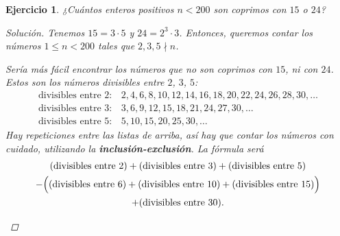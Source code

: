 \documentclass{article}
\theoremstyle{plain}
\newtheorem{ejercicio}{Ejercicio}
\newenvironment{solucion}{\begin{proof}[Solución]}{\end{proof}}
\begin{document}
\begin{ejercicio}
¿Cuántos enteros positivos $n < 200$ son coprimos con $15$ o $24$?

\ifdefined\solutions
\begin{solucion}
    Tenemos $15 = 3\cdot 5$ y $24 = 2^3\cdot 3$. Entonces, queremos contar los
    números $1 \le n < 200$ tales que $2, 3, 5 \nmid n$.

    Sería más fácil encontrar los números que \emph{no son} coprimos con $15$, ni con $24$.
    Estos son los números divisibles entre $2$, $3$, $5$:
    \begin{align*}
        \text{divisibles entre }2\colon & 2, 4, 6, 8, 10, 12, 14, 16, 18, 20, 22, 24, 26, 28, 30, \ldots \\
        \text{divisibles entre }3\colon & 3, 6, 9, 12, 15, 18, 21, 24, 27, 30, \ldots \\
        \text{divisibles entre }5\colon & 5, 10, 15, 20, 25, 30, \ldots
    \end{align*}
    Hay repeticiones entre las listas de arriba, así hay que contar los números
    con cuidado, utilizando la \textbf{inclusión-exclusión}. La fórmula será
    \begin{gather*}
        (\text{divisibles entre }2) + (\text{divisibles entre }3) + (\text{divisibles entre }5)\\
        -\Bigl((\text{divisibles entre }6) + (\text{divisibles entre }10) + (\text{divisibles entre }15)\Bigr) \\
        + (\text{divisibles entre }30).
    \end{gather*}

    \begin{center}
    \end{center}


\end{solucion}
\end{ejercicio}
\end{document}

